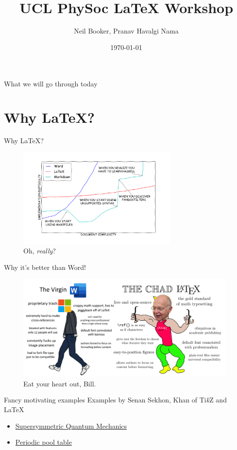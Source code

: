 \documentclass{beamer}
\title{UCL PhySoc {\LaTeX} Workshop}
\author{Neil Booker, Pranav Havalgi Nama}
\date{\today}
\theoremstyle{definition}
\theoremstyle{remark}
\begin{document}
\begin{frame}
\titlepage 
\end{frame}


\begin{frame}{What we will go through today}
\tableofcontents
\end{frame}

\section{Why {\LaTeX}?}
\begin{frame}{Why {\LaTeX}?}
\begin{figure}[H]
\centering
\includegraphics[width=8cm]{Graph.png}
\caption{Oh, \textit{really}?}
\end{figure}
\end{frame}
\begin{frame}{Why it's better than Word!}
\begin{figure}[H]
\centering
\includegraphics[width=11cm]{motivatingmeme.png}
\caption{Eat your heart out, Bill.}
\end{figure}
\end{frame}
\begin{frame}{Fancy motivating examples}
Examples by Senan Sekhon, Khan of Ti\textit{k}Z and {\LaTeX}
\begin{itemize}
\item \href{https://arxiv.org/pdf/2203.14693.pdf}{Supersymmetric Quantum Mechanics}
\item \href{https://www.overleaf.com/latex/examples/periodic-pool-table/cnfychgzwxjk.pdf}{Periodic pool table}
\end{itemize}
\end{frame}
\end{document}
